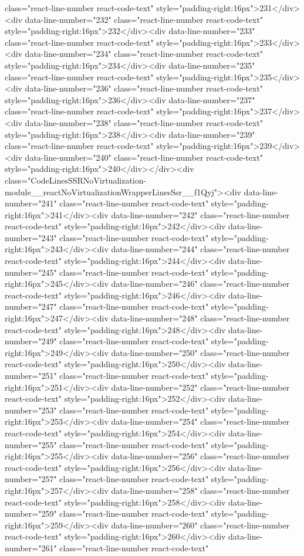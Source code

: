 {{{{{{{class="react-line-number react-code-text" style="padding-right:16px">231</div><div data-line-number="232" class="react-line-number react-code-text" style="padding-right:16px">232</div><div data-line-number="233" class="react-line-number react-code-text" style="padding-right:16px">233</div><div data-line-number="234" class="react-line-number react-code-text" style="padding-right:16px">234</div><div data-line-number="235" class="react-line-number react-code-text" style="padding-right:16px">235</div><div data-line-number="236" class="react-line-number react-code-text" style="padding-right:16px">236</div><div data-line-number="237" class="react-line-number react-code-text" style="padding-right:16px">237</div><div data-line-number="238" class="react-line-number react-code-text" style="padding-right:16px">238</div><div data-line-number="239" class="react-line-number react-code-text" style="padding-right:16px">239</div><div data-line-number="240" class="react-line-number react-code-text" style="padding-right:16px">240</div></div><div class="CodeLinesSSRNoVirtualization-module__reactNoVirtualizationWrapperLinesSsr__f1Qyj"><div data-line-number="241" class="react-line-number react-code-text" style="padding-right:16px">241</div><div data-line-number="242" class="react-line-number react-code-text" style="padding-right:16px">242</div><div data-line-number="243" class="react-line-number react-code-text" style="padding-right:16px">243</div><div data-line-number="244" class="react-line-number react-code-text" style="padding-right:16px">244</div><div data-line-number="245" class="react-line-number react-code-text" style="padding-right:16px">245</div><div data-line-number="246" class="react-line-number react-code-text" style="padding-right:16px">246</div><div data-line-number="247" class="react-line-number react-code-text" style="padding-right:16px">247</div><div data-line-number="248" class="react-line-number react-code-text" style="padding-right:16px">248</div><div data-line-number="249" class="react-line-number react-code-text" style="padding-right:16px">249</div><div data-line-number="250" class="react-line-number react-code-text" style="padding-right:16px">250</div><div data-line-number="251" class="react-line-number react-code-text" style="padding-right:16px">251</div><div data-line-number="252" class="react-line-number react-code-text" style="padding-right:16px">252</div><div data-line-number="253" class="react-line-number react-code-text" style="padding-right:16px">253</div><div data-line-number="254" class="react-line-number react-code-text" style="padding-right:16px">254</div><div data-line-number="255" class="react-line-number react-code-text" style="padding-right:16px">255</div><div data-line-number="256" class="react-line-number react-code-text" style="padding-right:16px">256</div><div data-line-number="257" class="react-line-number react-code-text" style="padding-right:16px">257</div><div data-line-number="258" class="react-line-number react-code-text" style="padding-right:16px">258</div><div data-line-number="259" class="react-line-number react-code-text" style="padding-right:16px">259</div><div data-line-number="260" class="react-line-number react-code-text" style="padding-right:16px">260</div><div data-line-number="261" class="react-line-number react-code-text" }}}}}}}
